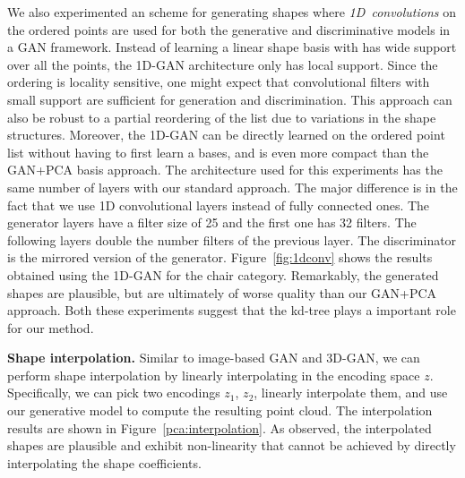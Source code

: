 We also experimented an scheme for generating shapes where \emph{1D~convolutions} on the ordered points are used for both the generative and discriminative models in a GAN framework. Instead of learning a linear shape basis with has wide support over all the points, the 1D-GAN architecture only has local support. Since the ordering is locality sensitive, one might expect that convolutional filters with small support are sufficient for generation and discrimination. This approach can also be robust to a partial reordering of the list due to variations in the shape structures. Moreover, the 1D-GAN can be directly learned on the ordered point list without having to first learn a bases, and is even more compact than the GAN+PCA basis approach. The architecture used for this experiments has the same number of layers with our standard approach. The major difference is in the fact that we use 1D convolutional layers instead of fully connected ones. The generator layers have a filter size of 25 and the first one has 32 filters. The following layers double the number filters of the previous layer. The discriminator is the mirrored version of the generator. Figure~\ref{fig:1dconv} shows the results obtained using the 1D-GAN for the chair category. Remarkably, the generated shapes are plausible, but are ultimately of worse quality than our GAN+PCA approach. Both these experiments suggest that the kd-tree plays a important role for our method.

\vspace{12pt}
\noindent \textbf{Shape interpolation.} Similar to image-based GAN and 3D-GAN, we can perform shape interpolation by linearly interpolating in the encoding space $z$. Specifically, we can pick two encodings $z_1$, $z_2$, linearly interpolate them, and use our generative model to compute the resulting point cloud. The interpolation results are shown in Figure~\ref{pca:interpolation}. As observed, the interpolated shapes are plausible and exhibit non-linearity that cannot be achieved by directly interpolating the shape coefficients.


